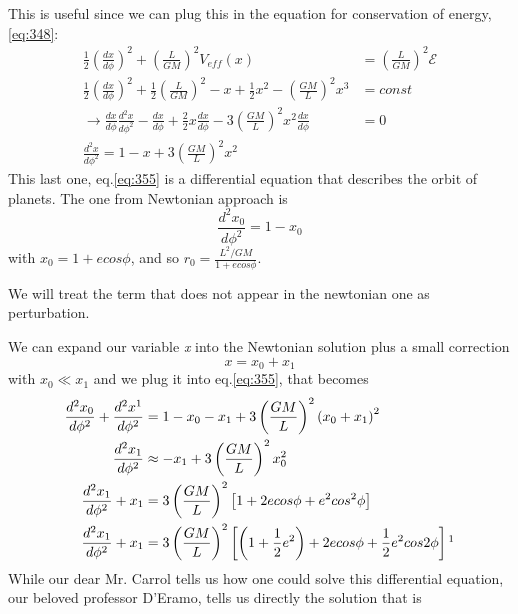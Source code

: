 This is useful since we can plug this in the equation for conservation of energy, \ref{eq:348}:
\begin{align}
	\frac{1}{2} \left( \frac{d x}{d \phi } \right)^{2} + \left( \frac{L}{GM} \right)^{2} V_{eff}\left( x \right) &= \left( \frac{L}{GM} \right)^{2} \mathcal{E} \nonumber\\ 
	\frac{1}{2} \left( \frac{d x}{d \phi } \right)^{2} + \frac{1}{2}\left( \frac{L}{GM} \right)^{2} - x + \frac{1}{2}x^{2} - \left( \frac{GM}{L} \right)^{2}x^{3} &= const \nonumber \\
	\to \frac{d x}{d \phi } \frac{d ^{2}x}{d \phi ^{2}} - \frac{d x}{d \phi } + \frac{2}{2}x \frac{d x}{d \phi } - 3 \left( \frac{GM}{L} \right)^{2}x^{2}\frac{d x}{d \phi } &=0\nonumber\\
	\frac{d ^{2}x}{d \phi ^{2}} = 1 - x + 3 \left( \frac{GM}{L} \right)^{2} x^{2} \label{eq:355}
\end{align}
This last one, eq.\ref{eq:355} is a differential equation that describes the orbit of planets. The one from Newtonian approach is 
\[
\frac{d^{2}x_{0} }{d \phi ^{2}} = 1 - x_{0}
\]
with $x_{0} = 1 + e cos \phi $, and so $r_{0} = \frac{L^{2}/GM}{1+e cos\phi }$.\par
We will treat the term that does not appear in the newtonian one as perturbation. \par
We can expand our variable \emph{x} into the Newtonian solution plus a small correction 
\begin{equation}\label{eq:xpansion}
x = x_{0} + x_{1} 
\end{equation}
with $x_{0} \ll x_{1}$
and we plug it into eq.\ref{eq:355}, that becomes
\begin{align}
	\frac{d ^{2}x_{0}}{d \phi ^{2}} + \frac{d ^{2}x^{1}}{d \phi ^{2}} &= 1 - x_{0} -x_{1} + 3\left( \frac{GM}{L} \right)^{2}\left( x_{0} +x_{1} \right)^{2} \nonumber \\
	\frac{d ^{2}x_{1}}{d \phi ^{2}} &\approx -x_{1} + 3 \left( \frac{GM}{L} \right)^{2}x_{0}^{2} \nonumber \\
	\frac{d ^{2}x_{1}}{d \phi^{2}} +x_{1} &= 3 \left( \frac{GM}{L} \right)^{2} \left[ 1 + 2ecos\phi + e^{2}cos^{2}\phi  \right] \nonumber \\
	\frac{d ^{2}x_{1}}{d \phi ^{2}} + x_{1} &= 3\left( \frac{GM}{L} \right)^{2} \left[ \left( 1 + \frac{1}{2}e^{2} \right) + 2ecos\phi + \frac{1}{2}e^{2} cos 2\phi  \right] \footnotemark
\end{align}
While our dear Mr. Carrol tells us how one could solve this differential equation, our beloved professor D'Eramo, tells us directly the solution that is
